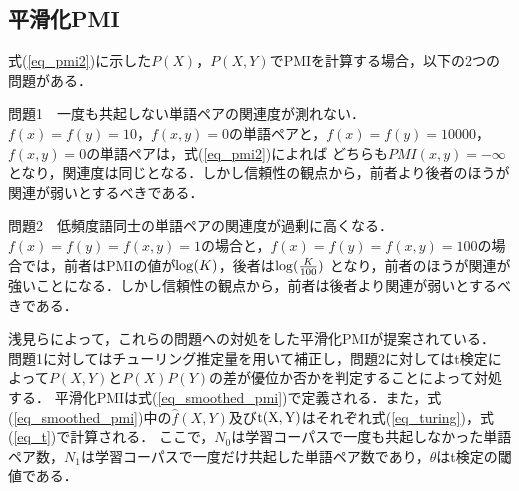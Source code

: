 \subsection{平滑化PMI}
式(\ref{eq_pmi2})に示した$P(X)$，$P(X, Y)$でPMIを計算する場合，以下の2つの問題がある．
\begin{description}
    \item 問題1　一度も共起しない単語ペアの関連度が測れない． \mbox{} \\
        $f(x) = f(y) = 10$，$f(x, y) = 0$の単語ペアと，$f(x) = f(y) = 10000$，$f(x, y) = 0$の単語ペアは，式(\ref{eq_pmi2})によれば
        どちらも$PMI(x, y) = -\infty$となり，関連度は同じとなる．しかし信頼性の観点から，前者より後者のほうが関連が弱いとするべきである．
    \item 問題2　低頻度語同士の単語ペアの関連度が過剰に高くなる． \mbox{} \\
        $f(x) = f(y) = f(x, y) = 1$の場合と，$f(x) = f(y) = f(x, y) = 100$の場合では，前者はPMIの値が${\rm log}(K)$，後者は${\rm log}(\frac{K}{100})$
        となり，前者のほうが関連が強いことになる．しかし信頼性の観点から，前者は後者より関連が弱いとするべきである．\\

\end{description}
浅見ら\cite{PMI}によって，これらの問題への対処をした平滑化PMIが提案されている．
問題1に対してはチューリング推定量\cite{turing}を用いて補正し，問題2に対してはt検定によって$P(X, Y)$と$P(X)P(Y)$の差が優位か否かを判定することによって対処する．
平滑化PMIは式(\ref{eq_smoothed_pmi})で定義される．また，式(\ref{eq_smoothed_pmi})中の$\hat{f}(X,Y)$及び${\rm t(X,Y)}$はそれぞれ式(\ref{eq_turing})，式(\ref{eq_t})で計算される．
ここで，$N_0$は学習コーパスで一度も共起しなかった単語ペア数，$N_1$は学習コーパスで一度だけ共起した単語ペア数であり，$\theta$はt検定の閾値である．

